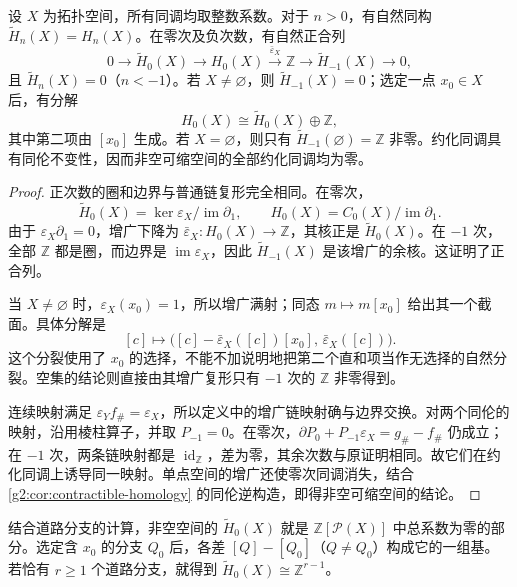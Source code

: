 \begin{proposition}\label{g2:prop:reduced-homology-degrees}
	设 \(X\) 为拓扑空间，所有同调均取整数系数。对于 \(n>0\)，有自然同构 \(\widetilde H_n(X)=H_n(X)\)。在零次及负次数，有自然正合列
	\[
		0\longrightarrow\widetilde H_0(X)
		\longrightarrow H_0(X)
		\xrightarrow{\bar\varepsilon_X}\mathbb Z
		\longrightarrow\widetilde H_{-1}(X)
		\longrightarrow0,
	\]
	且 \(\widetilde H_n(X)=0\)（\(n<-1\)）。若 \(X\ne\varnothing\)，则 \(\widetilde H_{-1}(X)=0\)；选定一点 \(x_0\in X\) 后，有分解
	\[
		H_0(X)\cong\widetilde H_0(X)\oplus\mathbb Z,
	\]
	其中第二项由 \([x_0]\) 生成。若 \(X=\varnothing\)，则只有 \(\widetilde H_{-1}(\varnothing)=\mathbb Z\) 非零。约化同调具有同伦不变性，因而非空可缩空间的全部约化同调均为零。
\end{proposition}
\begin{proof}
	正次数的圈和边界与普通链复形完全相同。在零次，
	\[
		\widetilde H_0(X)=\ker\varepsilon_X/\operatorname{im}\partial_1,
		\qquad
		H_0(X)=C_0(X)/\operatorname{im}\partial_1.
	\]
	由于 \(\varepsilon_X\partial_1=0\)，增广下降为 \(\bar\varepsilon_X:H_0(X)\to\mathbb Z\)，其核正是 \(\widetilde H_0(X)\)。在 \(-1\) 次，全部 \(\mathbb Z\) 都是圈，而边界是 \(\operatorname{im}\varepsilon_X\)，因此 \(\widetilde H_{-1}(X)\) 是该增广的余核。这证明了正合列。

	当 \(X\ne\varnothing\) 时，\(\varepsilon_X(x_0)=1\)，所以增广满射；同态 \(m\mapsto m[x_0]\) 给出其一个截面。具体分解是
	\[
		[c]\longmapsto
		\bigl([c]-\bar\varepsilon_X([c])[x_0],\,
		\bar\varepsilon_X([c])\bigr).
	\]
	这个分裂使用了 \(x_0\) 的选择，不能不加说明地把第二个直和项当作无选择的自然分裂。空集的结论则直接由其增广复形只有 \(-1\) 次的 \(\mathbb Z\) 非零得到。

	连续映射满足 \(\varepsilon_Yf_\#=\varepsilon_X\)，所以定义中的增广链映射确与边界交换。对两个同伦的映射，沿用棱柱算子，并取 \(P_{-1}=0\)。在零次，\(\partial P_0+P_{-1}\varepsilon_X=g_\#-f_\#\) 仍成立；在 \(-1\) 次，两条链映射都是 \(\operatorname{id}_{\mathbb Z}\)，差为零，其余次数与原证明相同。故它们在约化同调上诱导同一映射。单点空间的增广还使零次同调消失，结合 \cref{g2:cor:contractible-homology} 的同伦逆构造，即得非空可缩空间的结论。
\end{proof}

结合道路分支的计算，非空空间的 \(\widetilde H_0(X)\) 就是 \(\mathbb Z[\mathcal P(X)]\) 中总系数为零的部分。选定含 \(x_0\) 的分支 \(Q_0\) 后，各差 \([Q]-[Q_0]\)（\(Q\ne Q_0\)）构成它的一组基。若恰有 \(r\ge1\) 个道路分支，就得到 \(\widetilde H_0(X)\cong\mathbb Z^{r-1}\)。


